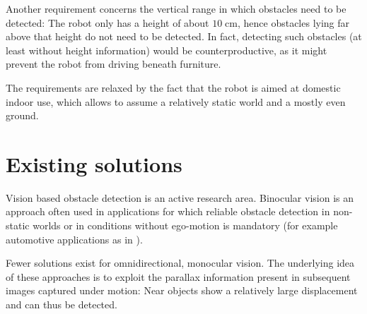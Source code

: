 Another requirement concerns the vertical range in which obstacles need to be detected: The robot only has a height of about $10\;\mathrm{cm}$, hence obstacles lying far above that height do not need to be detected. In fact, detecting such obstacles (at least without height information) would be counterproductive, as it might prevent the robot from driving beneath furniture.

The requirements are relaxed by the fact that the robot is aimed at domestic indoor use, which allows to assume a relatively static world and a mostly even ground.

\section{Existing solutions}

\label{sec:existing_solutions}

Vision based obstacle detection is an active research area. Binocular vision is an approach often used in applications for which reliable obstacle detection in non-static worlds or in conditions without ego-motion is mandatory (for example automotive applications as in \citealp{650851}).

Fewer solutions exist for omnidirectional, monocular vision. The underlying idea of these approaches is to exploit the parallax information present in subsequent images captured under motion: Near objects show a relatively large displacement and can thus be detected.

